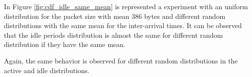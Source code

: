 In Figure \ref{fig:cdf_idle_same_mean} is represented a experiment with an uniform distribution for the packet size with mean 386 bytes and different random distributions with the same mean for the inter-arrival times. It can be observed that the idle periods distribution is almost the same for different random distribution if they have the same mean.

Again, the same behavior is observed for different random distributions in the active and idle distributions.
